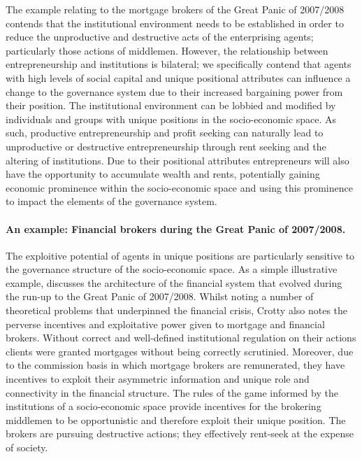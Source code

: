 The example relating to the mortgage brokers of the Great Panic of 2007/2008 contends that the institutional environment needs to be established in order to reduce the unproductive and destructive acts of the enterprising agents; particularly those actions of middlemen. However, the relationship between entrepreneurship and institutions is bilateral; we specifically contend that agents with high levels of social capital and unique positional attributes can influence a change to the governance system due to their increased bargaining power from their position. The institutional environment can be lobbied and modified by individuals and groups with unique positions in the socio-economic space. As such, productive entrepreneurship and profit seeking can naturally lead to unproductive or destructive entrepreneurship through rent seeking and the altering of institutions. Due to their positional attributes entrepreneurs will also have the opportunity to accumulate wealth and rents, potentially gaining economic prominence within the socio-economic space and using this prominence to impact the elements of the governance system.

\begin{framed}
\paragraph{An example: Financial brokers during the Great Panic of 2007/2008.}
The exploitive potential of agents in unique positions are particularly sensitive to the governance structure of the socio-economic space. As a simple illustrative example, \citet{Crotty2009} discusses the architecture of the financial system that evolved during the run-up to the Great Panic of 2007/2008. Whilst noting a number of theoretical problems that underpinned the financial crisis, Crotty also notes the perverse incentives and exploitative power given to mortgage and financial brokers. Without correct and well-defined institutional regulation on their actions clients were granted mortgages without being correctly scrutinied. Moreover, due to the commission basis in which mortgage brokers are remunerated, they have incentives to exploit their asymmetric information and unique role and connectivity in the financial structure. The rules of the game informed by the institutions of a socio-economic space provide incentives for the brokering middlemen to be opportunistic and therefore exploit their unique position. The brokers are pursuing destructive actions; they effectively rent-seek at the expense of society.
\end{framed}

